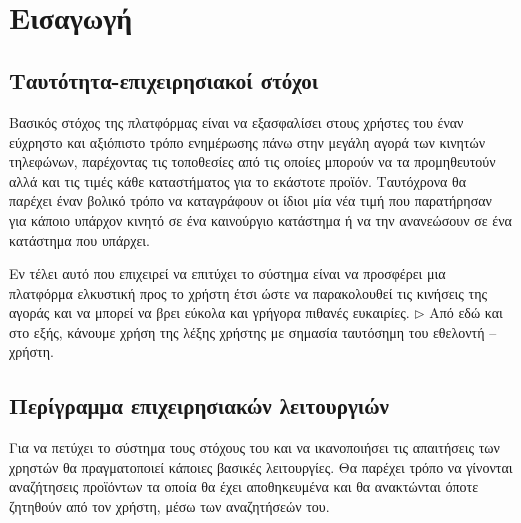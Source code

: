 \documentclass[12pt, oneside, a4paper]{report}
\begin{document}
\\
\\
\\
    \vspace{1cm}
\\
    \vspace{1cm}

\pagestyle{plain}
\normalsize
\section{Εισαγωγή}

\subsection{Ταυτότητα-επιχειρησιακοί στόχοι}

\hspace{0.6cm}Βασικός στόχος της πλατφόρμας είναι να εξασφαλίσει στους χρήστες του έναν εύχρηστο και αξιόπιστο τρόπο ενημέρωσης πάνω στην μεγάλη αγορά των κινητών τηλεφώνων, παρέχοντας τις τοποθεσίες από τις οποίες μπορούν να τα προμηθευτούν αλλά και τις τιμές κάθε καταστήματος για το εκάστοτε προϊόν. Ταυτόχρονα θα παρέχει έναν βολικό τρόπο να καταγράφουν οι ίδιοι μία νέα τιμή που παρατήρησαν για κάποιο υπάρχον κινητό σε ένα καινούργιο κατάστημα ή να την ανανεώσουν σε ένα κατάστημα που υπάρχει. 

\hspace{0.6cm}Εν τέλει αυτό που επιχειρεί να επιτύχει το σύστημα είναι να προσφέρει μια πλατφόρμα ελκυστική προς το χρήστη έτσι ώστε να παρακολουθεί τις κινήσεις της αγοράς και να μπορεί να βρει εύκολα και γρήγορα πιθανές ευκαιρίες.
\newline
\newline
$\triangleright$ Από εδώ και στο εξής, κάνουμε χρήση της λέξης χρήστης με σημασία ταυτόσημη του εθελοντή – χρήστη.


\subsection{Περίγραμμα επιχειρησιακών λειτουργιών}
\hspace{0.6cm}Για να πετύχει το σύστημα τους στόχους του και να ικανοποιήσει τις απαιτήσεις των χρηστών θα πραγματοποιεί κάποιες βασικές λειτουργίες. Θα παρέχει τρόπο να γίνονται αναζήτησεις προϊόντων τα οποία θα έχει αποθηκευμένα και θα ανακτώνται όποτε ζητηθούν από τον χρήστη, μέσω των αναζητήσεών του.
\end{document}
